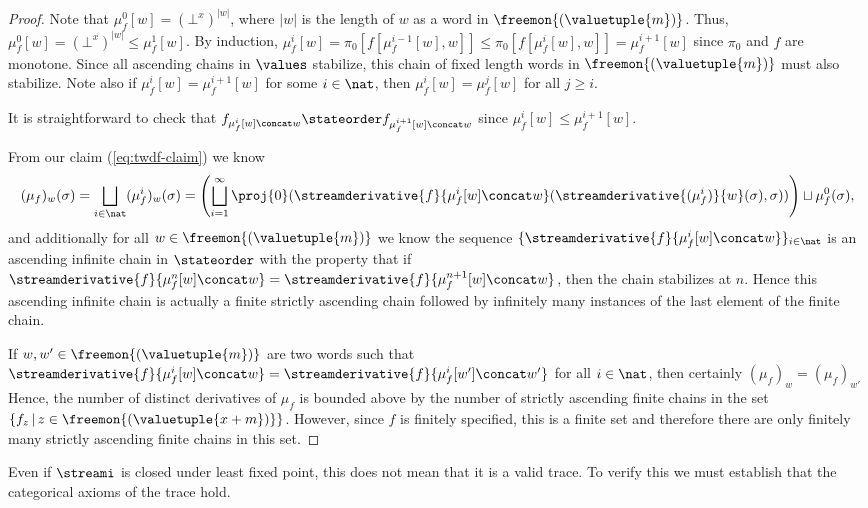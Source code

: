 \documentclass{lmcs}
\begin{document}
\begin{proof}
    Note that $\mu_f^0[w] = (\bot^x)^{|w|}$, where $|w|$ is
    the length of $w$ as a word in $\freemon{(\valuetuple{m})}$. Thus,
    $\mu_f^0[w] = (\bot^x)^{|w|} \leq \mu_f^1[w]$. By induction,
    $\mu_f^i[w] = \pi_0[f[\mu_f^{i-1}[w], w]]
        \leq \pi_0[f[\mu_f^i[w], w]] = \mu_f^{i+1}[w]$
    since $\pi_0$ and $f$ are monotone.
    Since all ascending chains in $\values$ stabilize, this chain of fixed length
    words in $\freemon{(\valuetuple{m})}$ must also stabilize.
    Note also if $\mu_f^i[w] = \mu_f^{i+1}[w]$ for some $i \in \nat$, then
    $\mu_f^i[w] = \mu_f^j[w]$ for all $j \geq i$.

    It is straightforward to check that
    $f_{\mu_f^i[w]\concat w} \stateorder f_{\mu_f^{i+1}[w]\concat w}$
    since $\mu_f^i[w] \leq \mu_f^{i+1}[w]$.

    From our claim (\ref{eq:twdf-claim}) we know
    \[
        (\mu_f)_w(\sigma) = \bigsqcup_{i \in \nat} (\mu_f^i)_w(\sigma)
        = \left(\bigsqcup_{i = 1}^\infty \proj{0}(
            \streamderivative{f}{\mu_f^{i}[w]\concat w}(
            \streamderivative{(\mu_f^i)}{w}(\sigma),\sigma))\right) \sqcup \mu_f^0(\sigma),
    \]
    and additionally for all $w \in \freemon{(\valuetuple{m})}$ we know the sequence
    $\{\streamderivative{f}{\mu_f^{i}[w]\concat w}\}_{i \in \nat}$ is an
    ascending infinite chain in
    $\stateorder$ with the property that
    if $\streamderivative{f}{\mu_f^{n}[w]\concat w} = \streamderivative{f}{\mu_f^{n+1}[w]\concat w}$, then the chain stabilizes at $n$.
    Hence this ascending infinite chain is actually a finite strictly ascending
    chain followed by infinitely many instances of the last element of the finite chain.

    If $w, w' \in \freemon{(\valuetuple{m})}$ are two words such that
    $\streamderivative{f}{\mu_f^{i}[w]\concat w} = \streamderivative{f}{\mu_f^{i}[w']\concat w'}$ for all $i \in \nat$, then certainly $(\mu_f)_w = (\mu_f)_{w'}$
    Hence, the number of distinct derivatives of $\mu_f$ is bounded above by
    the number of strictly ascending finite chains in the set
    $\{f_z \,|\, z \in \freemon{(\valuetuple{x+m})}\}$.
    However, since $f$ is finitely specified, this is a finite set
    and therefore there are only finitely many strictly ascending finite chains
    in this set.
\end{proof}

Even if \(\streami\) is closed under least fixed point, this does not mean that
it is a valid trace.
To verify this we must establish that the categorical axioms of the trace hold.
\end{document}
